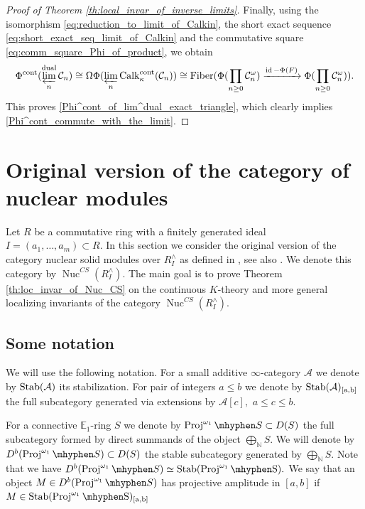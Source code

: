 \documentclass[11pt,leqno]{amsart}
\numberwithin{equation}{section}
\def\N{\mathbb{N}}
\newcommand{\hy}{\mhyphen}
\newcommand{\prolim}[1][]{\mathop{\varprojlim}\limits_{#1}}
\newcommand{\biggplus}[1][]{\mathop{\bigoplus}\limits_{#1}}
\newcommand{\prodd}[1][]{\mathop{\prod}\limits_{#1}}
\newcommand{\xto}{\xrightarrow}
\newcommand{\Nuc}{\operatorname{Nuc}}
\newcommand{\Proj}{\operatorname{Proj}}
\newcommand{\Fiber}{\operatorname{Fiber}}
\newcommand{\cont}{\operatorname{cont}}
\newcommand{\dual}{\operatorname{dual}}
\newcommand{\bE}{{\mathbb E}}
\newcommand{\cA}{{\mathcal A}}
\newcommand{\cC}{{\mathcal C}}
\newcommand{\Calk}{\operatorname{Calk}}
\newcommand{\Stab}{\rm Stab}
\newcommand{\id}{\operatorname{id}}
\begin{document}
\begin{proof}[Proof of Theorem \ref{th:local_invar_of_inverse_limits}]
Finally, using the isomorphism \eqref{eq:reduction_to_limit_of_Calkin}, the short exact sequence \eqref{eq:short_exact_seq_limit_of_Calkin} and the commutative square \eqref{eq:comm_square_Phi_of_product}, we obtain
\begin{equation*}
\Phi^{\cont}(\prolim[n]^{\dual}\cC_n)\cong \Omega \Phi(\prolim[n]\Calk_{\kappa}^{\cont}(\cC_n))\cong \Fiber(\Phi(\prodd[n\geq 0]\cC_n^{\omega})\xto{\id-\Phi(F)}\Phi(\prodd[n\geq 0]\cC_n^{\omega})).
\end{equation*}
 This proves \ref{Phi^cont_of_lim^dual_exact_triangle}, which clearly implies \ref{Phi^cont_commute_with_the_limit}.
\end{proof}

\section{Original version of the category of nuclear modules}
\label{sec:original_Nuc}

Let $R$ be a commutative ring with a finitely generated ideal $I=(a_1,\dots,a_m)\subset R.$ In this section we consider the original version of the category nuclear solid modules over $R^{\wedge}_{I}$ as defined in \cite{CS20}, see also \cite{CS24, And23, AM24}. We denote this category by $\Nuc^{CS}(R^{\wedge}_I).$ The main goal is to prove Theorem \ref{th:loc_invar_of_Nuc_CS} on the continuous $K$-theory and more general localizing invariants of the category $\Nuc^{CS}(R^{\wedge}_I).$

\subsection{Some notation}\label{ssec:some_notation}
 We will use the following notation. For a small additive $\infty$-category $\cA$ we denote by $\Stab(\cA)$ its stabilization. For pair of integers $a\leq b$ we denote by $\Stab(\cA)_{[a,b]}$ the full subcategory generated via extensions by $\cA[c],$ $a\leq c\leq b.$
 
 For a connective $\bE_1$-ring $S$ we denote by $\Proj^{\omega_1}\hy S\subset D(S)$ the full subcategory formed by direct summands of the object $\biggplus[\N]S.$ We will denote by $D^b(\Proj^{\omega_1}\hy S)\subset D(S)$ the stable subcategory generated by $\biggplus[\N]S.$ Note that we have $D^b(\Proj^{\omega_1}\hy S)\simeq\Stab(\Proj^{\omega_1}\hy S).$ We say that an object $M\in D^b(\Proj^{\omega_1}\hy S)$ has projective amplitude in $[a,b]$ if $M\in \Stab(\Proj^{\omega_1}\hy S)_{[a,b]}$
\end{document}
